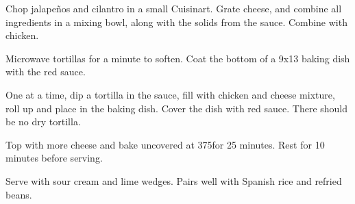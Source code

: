 \begin{recipe}
Chop jalapeños and cilantro in a small Cuisinart. Grate cheese, and combine all ingredients in a mixing bowl, along with the solids from the sauce. Combine with chicken.


Microwave tortillas for a minute to soften. Coat the bottom of a 9x13 baking dish with the red sauce.

One at a time, dip a tortilla in the sauce, fill with chicken and cheese mixture, roll up and place in the baking dish. Cover the dish with red sauce. There should be no dry tortilla.

Top with more cheese and bake uncovered at 375\degree for 25 minutes. Rest for 10 minutes before serving.

Serve with sour cream and lime wedges. Pairs well with Spanish rice and refried beans.

\end{recipe}
